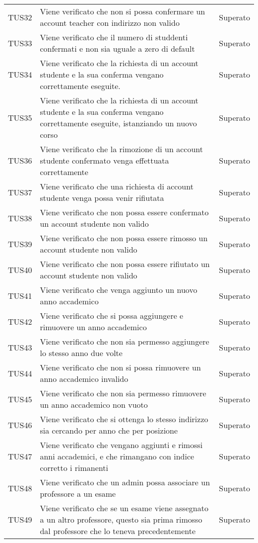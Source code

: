 \documentclass[PianoDiQualifica.tex]{subfiles}
\begin{document}
\begin{longtable}[H]{P{2cm}P{8.5cm}P{3cm}}
	TUS32 & Viene verificato che non si possa confermare un account teacher con indirizzo non valido & Superato \\
	TUS33 & Viene verificato che il numero di studdenti confermati e non sia uguale a zero di default & Superato \\
	TUS34 & Viene verificato che la richiesta di un account studente e la sua conferma vengano correttamente eseguite. & Superato \\
	TUS35 & Viene verificato che la richiesta di un account studente e la sua conferma vengano correttamente eseguite, istanziando un nuovo corso & Superato \\
	TUS36 & Viene verificato che la rimozione di un account studente confermato venga effettuata correttamente & Superato \\
	TUS37 & Viene verificato che una richiesta di account studente venga possa venir rifiutata & Superato \\
	TUS38 & Viene verificato che non possa essere confermato un account studente non valido & Superato \\
	TUS39 & Viene verificato che non possa essere rimosso un account studente non valido & Superato \\
	TUS40 & Viene verificato che non possa essere rifiutato un account studente non valido & Superato \\
	TUS41 & Viene verificato che venga aggiunto un nuovo anno accademico & Superato\\
	TUS42 & Viene verificato che si possa aggiungere e rimuovere un anno accademico& Superato\\
	TUS43 & Viene verificato che non sia permesso aggiungere lo stesso anno due volte & Superato\\
	TUS44 & Viene verificato che non si possa rimuovere un anno accademico invalido & Superato\\
	TUS45 & Viene verificato che non sia permesso rimuovere un anno accademico non vuoto & Superato\\
	TUS46 & Viene verificato che si ottenga lo stesso indirizzo sia cercando per anno che per posizione & Superato\\
	TUS47 & Viene verificato che vengano aggiunti e rimossi anni accademici, e che rimangano con indice corretto i rimanenti & Superato\\
	TUS48 & Viene verificato che un admin possa associare un professore a un esame & Superato \\
	TUS49 & Viene verificato che se un esame viene assegnato a un altro professore, questo sia prima rimosso dal professore che lo teneva precedentemente & Superato \\

\end{longtable}
\end{document}
